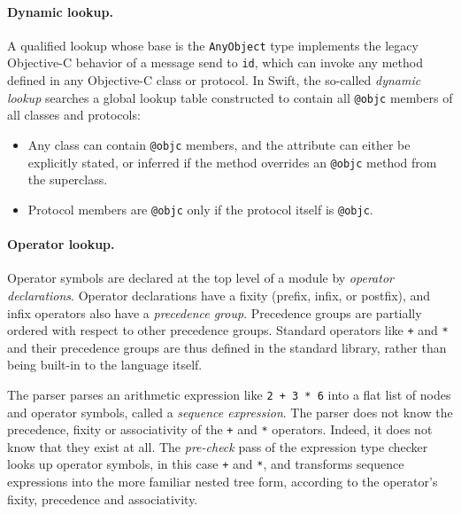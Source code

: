 \documentclass[../generics]{subfiles}
\begin{document}
\paragraph{Dynamic lookup.} A qualified lookup whose base is the \texttt{AnyObject} type implements the legacy Objective-C behavior of a message send to \texttt{id}, which can invoke any method defined in any Objective-C class or protocol. In Swift, the so-called \emph{dynamic lookup} searches a global lookup table constructed to contain all \texttt{@objc} members of all classes and protocols:
\begin{itemize}
\item Any class can contain \texttt{@objc} members, and the attribute can either be explicitly stated, or inferred if the method overrides an \texttt{@objc} method from the superclass.
\item Protocol members are \texttt{@objc} only if the protocol itself is \texttt{@objc}.
\end{itemize}

\paragraph{Operator lookup.}
Operator symbols are declared at the top level of a module by \emph{operator declarations}. Operator declarations have a fixity (prefix, infix, or postfix), and infix operators also have a \emph{precedence group}. Precedence groups are partially ordered with respect to other precedence groups. Standard operators like \texttt{+} and \texttt{*} and their precedence groups are thus defined in the standard library, rather than being built-in to the language itself.

The parser parses an arithmetic expression like \texttt{2 + 3 * 6} into a flat list of nodes and operator symbols, called a \emph{sequence expression}. The parser does not know the precedence, fixity or associativity of the \texttt{+} and \texttt{*} operators. Indeed, it does not know that they exist at all. The \emph{pre-check} pass of the expression type checker looks up operator symbols, in this case \texttt{+} and \texttt{*}, and transforms sequence expressions into the more familiar nested tree form, according to the operator's fixity, precedence and associativity.
\end{document}
